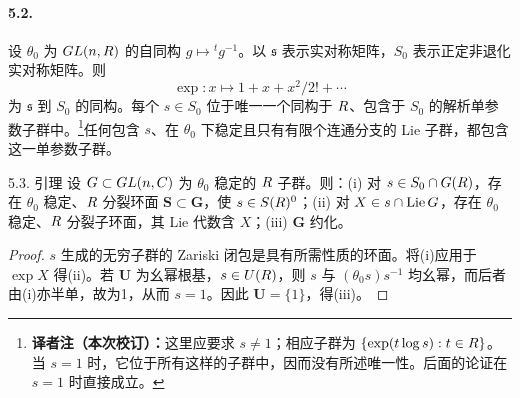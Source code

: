 \paragraph*{5.2.} 设 $\theta_0$ 为 $GL(n,R)$ 的自同构 $g\mapsto{}^tg^{-1}$。以 $\mathfrak s$ 表示实对称矩阵，$S_0$ 表示正定非退化实对称矩阵。则
\[
 \exp:x\mapsto1+x+x^2/2!+\cdots
\]
为 $\mathfrak s$ 到 $S_0$ 的同构。每个 $s\in S_0$ 位于唯一一个同构于 $R$、包含于 $S_0$ 的解析单参数子群中。\footnote{\textbf{译者注（本次校订）：}这里应要求 $s\ne1$；相应子群为 $\{\exp(t\log s):t\in R\}$。当 $s=1$ 时，它位于所有这样的子群中，因而没有所述唯一性。后面的论证在 $s=1$ 时直接成立。}任何包含 $s$、在 $\theta_0$ 下稳定且只有有限个连通分支的 Lie 子群，都包含这一单参数子群。
\begin{originaltheorem}{5.3. 引理}
设 $G\subset GL(n,C)$ 为 $\theta_0$ 稳定的 $R$ 子群。则：(i) 对 $s\in S_0\cap G(R)$，存在 $\theta_0$ 稳定、$R$ 分裂环面 $\mathbf S\subset\mathbf G$，使 $s\in S(R)^0$；(ii) 对 $X\in s\cap\operatorname{Lie}G$，存在 $\theta_0$ 稳定、$R$ 分裂子环面，其 Lie 代数含 $X$；(iii) $\mathbf G$ 约化。
\end{originaltheorem}
\begin{proof}
$s$ 生成的无穷子群的 Zariski 闭包是具有所需性质的环面。将(i)应用于 $\exp X$ 得(ii)。若 $\mathbf U$ 为幺幂根基，$s\in U(R)$，则 $s$ 与 $(\theta_0s)s^{-1}$ 均幺幂，而后者由(i)亦半单，故为1，从而 $s=1$。因此 $\mathbf U=\{1\}$，得(iii)。
\end{proof}
